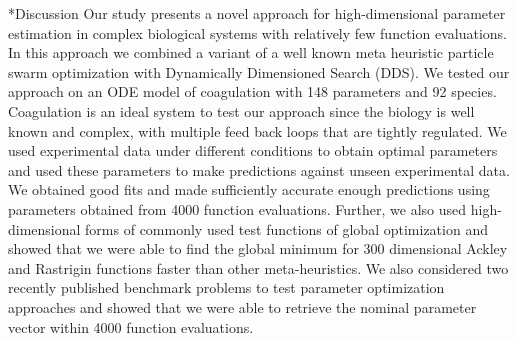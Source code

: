 \documentclass[12pt]{article}
\makeatletter
\renewcommand\section{\@startsection
	{subsection}{2}{0mm}
	{-0.2in}
	{0.05\baselineskip}
	{\normalfont\large\bfseries}}
\makeatother
\begin{document}
\section*{Discussion}
Our study presents a novel approach for high-dimensional parameter estimation in complex biological systems with relatively few function evaluations. In this approach we combined a variant of a well known meta heuristic particle swarm optimization with Dynamically Dimensioned Search (DDS). We tested our approach on an ODE model of coagulation with 148 parameters and 92 species. Coagulation is an ideal system to test our approach since the biology is well known and complex, with multiple feed back loops that are tightly regulated. We used experimental data under different conditions to obtain optimal parameters and used these parameters to make predictions against unseen experimental data. We obtained good fits and made sufficiently accurate enough predictions using parameters obtained from 4000 function evaluations. Further, we also used high-dimensional forms of commonly used test functions of global optimization and showed that we were able to find the global minimum for 300 dimensional Ackley and Rastrigin functions faster than other meta-heuristics. We also considered two recently published benchmark problems to test parameter optimization approaches and showed that we were able to retrieve the nominal parameter vector within 4000 function evaluations.
\end{document}
